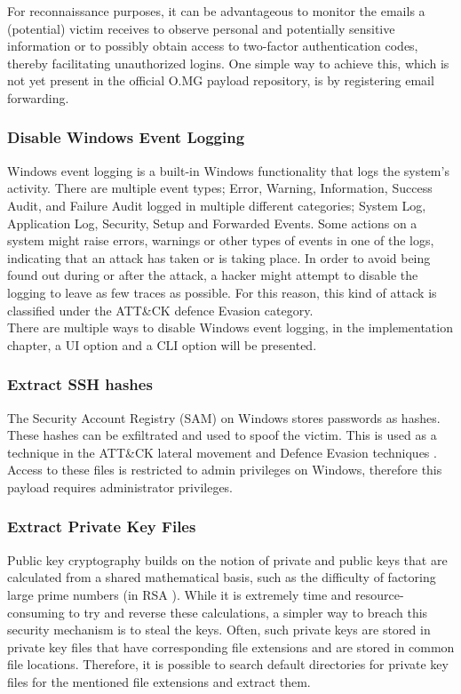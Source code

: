 For reconnaissance purposes, it can be advantageous to monitor the emails a (potential) victim receives to observe personal and potentially sensitive information or to possibly obtain access to two-factor authentication codes, thereby facilitating unauthorized logins. One simple way to achieve this, which is not yet present in the official O.MG payload repository, is by registering email forwarding. 


\subsubsection{Disable Windows Event Logging}

Windows event logging is a built-in Windows functionality that logs the system's activity. There are multiple event types; Error, Warning, Information, Success Audit, and Failure Audit logged in multiple different categories; System Log, Application Log, Security, Setup and Forwarded Events. 
Some actions on a system might raise errors, warnings or other types of events in one of the logs, indicating that an attack has taken or is taking place. In order to avoid being found out during or after the attack, a hacker might attempt to disable the logging to leave as few traces as possible. For this reason, this kind of attack is classified under the ATT\&CK defence Evasion category. \\
There are multiple ways to disable Windows event logging, in the implementation chapter, a UI option and a CLI option will be presented. 


\subsubsection{Extract SSH hashes}

The Security Account Registry (SAM) on Windows stores passwords as hashes. These hashes can be exfiltrated and used to spoof the victim. This is used as a technique in the ATT\&CK lateral movement and Defence Evasion techniques \cite{UseAlternateAuthentication}. \\
Access to these files is restricted to admin privileges on Windows, therefore this payload requires administrator privileges.

\subsubsection{Extract Private Key Files}

Public key cryptography builds on the notion of private and public keys that are calculated from a shared mathematical basis, such as the difficulty of factoring large prime numbers (in RSA \cite{rivestMethodObtainingDigital1978}). While it is extremely time and resource-consuming to try and reverse these calculations, a simpler way to breach this security mechanism is to steal the keys. Often, such private keys are stored in private key files that have corresponding file extensions and are stored in common file locations. Therefore, it is possible to search default directories for private key files for the mentioned file extensions and extract them.    


